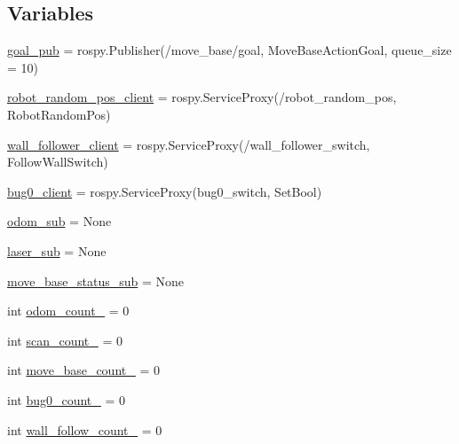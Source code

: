 \subsection*{Variables}
\begin{DoxyCompactItemize}
\item 
\hyperlink{namespaceassignment__user__interface_aad88459a092ebc2d4fee4bf1e1337b5e}{goal\+\_\+pub} = rospy.\+Publisher(\textquotesingle{}/move\+\_\+base/goal\textquotesingle{}, Move\+Base\+Action\+Goal, queue\+\_\+size = 10)
\item 
\hyperlink{namespaceassignment__user__interface_a6cc7b5f702a16a13476486104efcd2a3}{robot\+\_\+random\+\_\+pos\+\_\+client} = rospy.\+Service\+Proxy(\textquotesingle{}/robot\+\_\+random\+\_\+pos\textquotesingle{}, Robot\+Random\+Pos)
\item 
\hyperlink{namespaceassignment__user__interface_ab525e4785013b455a7980ed1ba63714e}{wall\+\_\+follower\+\_\+client} = rospy.\+Service\+Proxy(\textquotesingle{}/wall\+\_\+follower\+\_\+switch\textquotesingle{}, Follow\+Wall\+Switch)
\item 
\hyperlink{namespaceassignment__user__interface_a8a670e78862fa183bc048efc9d22052a}{bug0\+\_\+client} = rospy.\+Service\+Proxy(\textquotesingle{}bug0\+\_\+switch\textquotesingle{}, Set\+Bool)
\item 
\hyperlink{namespaceassignment__user__interface_aff3436412ba56471e20393affeacf07e}{odom\+\_\+sub} = None
\item 
\hyperlink{namespaceassignment__user__interface_a13b07208a0d16bf7cacbc7f406d55a96}{laser\+\_\+sub} = None
\item 
\hyperlink{namespaceassignment__user__interface_af33582718e5b57327c67b7d635e1b03e}{move\+\_\+base\+\_\+status\+\_\+sub} = None
\item 
int \hyperlink{namespaceassignment__user__interface_a83ab99f37eebd687c37e0aa02f9f3e8d}{odom\+\_\+count\+\_\+} = 0
\item 
int \hyperlink{namespaceassignment__user__interface_a371f1e7966a361df34dd57d69996b9fc}{scan\+\_\+count\+\_\+} = 0
\item 
int \hyperlink{namespaceassignment__user__interface_abf6717fba99f4ab68964800a70d0b644}{move\+\_\+base\+\_\+count\+\_\+} = 0
\item 
int \hyperlink{namespaceassignment__user__interface_a76779c4f5d75c01e4e1f4c6267b7a4fa}{bug0\+\_\+count\+\_\+} = 0
\item 
int \hyperlink{namespaceassignment__user__interface_a01e008cb67a46d4333ebe27c5c3f4e53}{wall\+\_\+follow\+\_\+count\+\_\+} = 0

\end{DoxyCompactItemize}
